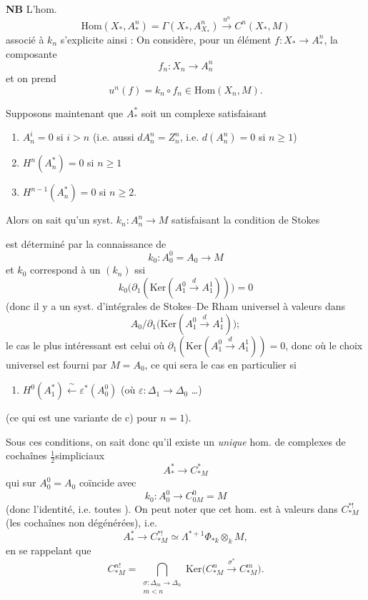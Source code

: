 \documentclass[11pt,a4paper]{article}
\begin{document}



\textbf{NB} L'hom.
\[
  \mathrm{Hom}(X_*, A^n_*) = \Gamma(X_*, A^n_{X_*}) \xrightarrow{u^n} C^n(X_*, M)
\]
associé à $k_n$ s'explicite ainsi : On considère, pour un \struck{\ill{}} élément
$f : X_* \to A^n_*$, la composante
\[
  f_n : X_n \to A^n_n
\]
et on prend
\[
  u^n(f) = k_n \circ f_n \in \mathrm{Hom}(X_n, M).
\]

Supposons maintenant  que $A^*_*$
\struck{\ill{}} soit un complexe satisfaisant
\begin{enumerate}
  \item[a)] $A^i_n = 0$ si $i > n$ \quad (i.e. aussi $d A^n_n = Z^n_n$, i.e. $d(A^n_n) = 0$ si $n \geq 1$)
  \item[b)] $H^n(A^*_n) = 0$ si $n \geq 1$
  \item[c)] $H^{n-1}(A^*_n) = 0$ si $n \geq 2$.
\end{enumerate}
Alors on sait qu'un syst. $k_n : A^n_n \to M$ satisfaisant la condition de Stokes

est déterminé par la connaissance de
\[
  k_0 : A^0_0 = A_0 \longrightarrow M
\]
et $k_0$ correspond à un $(k_n)$ ssi
\[
  k_0\bigl(\partial_1(\mathrm{Ker}(A^0_1 \xrightarrow{d} A^1_1))\bigr) = 0
\]
(donc il y a un syst. d'intégrales de Stokes--De Rham \og universel \fg{} à valeurs dans
\[
  A_0 / \partial_1\bigl(\mathrm{Ker}(A^0_1 \xrightarrow{d} A^1_1)\bigr) ;
\]
le cas le plus intéressant est celui où $\partial_1(\mathrm{Ker}(A^0_1 \xrightarrow{d} A^1_1)) = 0$,
donc où le choix universel est fourni par $M = A_0$, ce qui sera le cas en particulier si
\begin{enumerate}
  \item[c')] $H^0(A^*_1) \xleftarrow{\;\sim\;} \varepsilon^*(A^0_0)$ \quad (où $\varepsilon : \Delta_1 \to \Delta_0$ \ldots)
\end{enumerate}
(ce qui est une variante de c) pour $n = 1$).

Sous ces conditions, on sait donc qu'il existe un \emph{unique} hom. de complexes de
cochaînes $\frac{1}{2}$simpliciaux
\[
  A^*_* \longrightarrow C^*_{*M}
\]
qui sur $A^0_0 = A_0$ coïncide avec
\[
  k_0 : A^0_0 \longrightarrow C^0_{0M} = M
\]
(donc l'identité, i.e. toutes  ). On peut noter
que  cet hom. est à valeurs dans $C^{*!}_{*M}$ (les cochaînes non
dégénérées), i.e. 
\[
  A^*_* \longrightarrow C^{*!}_{*M} \simeq \Lambda^{*+1} \Phi_{*k} \otimes_k M,
\]
en se rappelant que
\[
  C^{n!}_{*M} = \bigcap_{\substack{\sigma : \Delta_m \to \Delta_n \\ m < n}}
  \mathrm{Ker}\bigl(C^n_{*M} \xrightarrow{\sigma^*} C^m_{*M}\bigr).
\]
\end{document}
